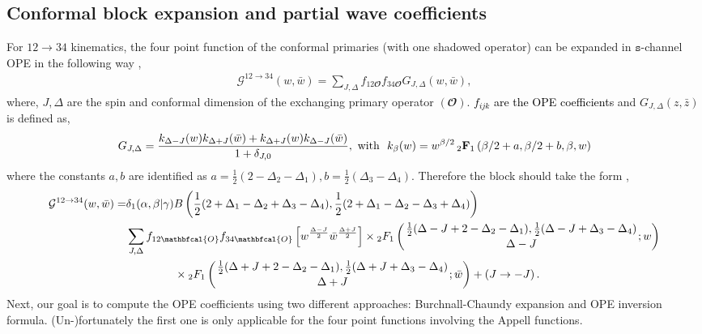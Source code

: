 \subsection{Conformal block expansion and partial wave coefficients}
For $12\to 34$ kinematics, the four point function of the conformal primaries (with one shadowed operator) can be expanded in $\texttt{s}$-channel OPE in the following way \cite{Dolan:2003hv,Caron-Huot:2017vep},
\begin{align}
    \mathcal{G}^{12\to 34}(w,\bar w)=\sum_{J,\Delta}f_{12\mathbfcal{O}}f_{34\mathbfcal{O}}G_{J,\Delta}(w,\bar w),\label{4.29}
\end{align}
where, $J,\Delta$ are the spin and conformal dimension of the exchanging primary operator $(\mathbfcal{O})$. \textcolor{black}{$f_{ijk}$ are the  OPE coefficients} and $G_{J,\Delta}(z,\bar z)$ is defined as,
\begin{align}
    G_{J,\Delta}=\frac{k_{\Delta-J}(w)k_{\Delta+J}(\bar w)+k_{\Delta+J}(w)k_{\Delta-J}(\bar w)}{1+\delta_{J,0}}, \textrm{\,\,with }\,\,k_{\beta}(w)=w^{\beta/2}\,{}_{2}\mathbf{F}_1\left(\beta/2+a,\beta/2+b,\beta,w\right)
\end{align}
where the constants $a,b$ are identified as $a=\frac{1}{2}(2-\Delta_2-\Delta_1),b=\frac{1}{2}(\Delta_3-\Delta_4)$.
Therefore the block should take the form \cite{Osborn:2012vt,Caron-Huot:2017vep},
\begin{align}    \begin{split}\mathcal{G}^{12\to 34}(w,\bar w)=&\delta_1(\alpha,\beta|\gamma)B\left(\frac{1}{2}(2+\Delta_1-\Delta_2+\Delta_3-\Delta_4),\frac{1}{2}(2+\Delta_1-\Delta_2-\Delta_3+\Delta_4)\right)\\&\sum_{J,\Delta}f_{12\mathbfcal{O}}f_{34\mathbfcal{O}}\left[w^{\frac{\Delta-J}{2}}\bar w^{\frac{\Delta+J}{2}}\right]\times{_2}F_1\left(\genfrac{}{}{0pt}{}{\frac{1}{2}(\Delta-J+2-\Delta_2-\Delta_1),\frac{1}{2}(\Delta-J+\Delta_3-\Delta_4)}{\Delta-J};w\right)\\&\hspace{1.5 cm} \times {_2}F_1\left(\genfrac{}{}{0pt}{}{\frac{1}{2}(\Delta+J+2-\Delta_2-\Delta_1),\frac{1}{2}(\Delta+J+\Delta_3-\Delta_4)}{\Delta+J};\bar w\right)+(J\to -J)\,.\label{4.36k}
  \end{split}
\end{align}
Next, our goal is to compute the OPE coefficients using two different approaches: Burchnall-Chaundy expansion and OPE inversion formula. (Un-)fortunately the first one is only applicable for the four point functions involving the Appell functions.

